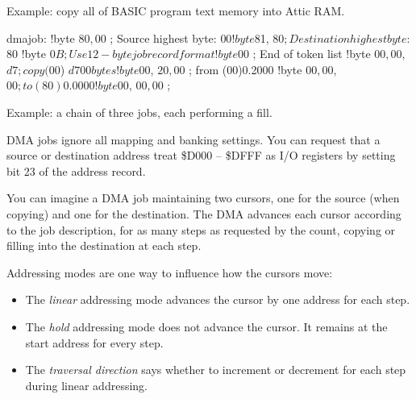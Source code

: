 Example: copy all of BASIC program text memory into Attic RAM.

\begin{asmcode}
dmajob:
!byte $80, $00       ; Source highest byte: $00
!byte $81, $80       ; Destination highest byte: $80
!byte $0B            ; Use 12-byte job record format
!byte $00            ; End of token list
!byte $00, $00, $d7  ; copy ($00) $d700 bytes
!byte $00, $20, $00  ; from (00)0.2000
!byte $00, $00, $00  ; to (80)0.0000
!byte $00, $00, $00  ;
\end{asmcode}

Example: a chain of three jobs, each performing a fill.


DMA jobs ignore all mapping and banking settings. You can request that a source or destination address treat \$D000 -- \$DFFF as I/O registers by setting bit 23 of the address record.

You can imagine a DMA job maintaining two cursors, one for the source (when copying) and one for the destination. The DMA advances each cursor according to the job description, for as many steps as requested by the count, copying or filling into the destination at each step.

Addressing modes are one way to influence how the cursors move:

\begin{itemize}
\item The {\em linear} addressing mode advances the cursor by one address for each step.
\item The {\em hold} addressing mode does not advance the cursor. It remains at the start address for every step.
\item The {\em traversal direction} says whether to increment or decrement for each step during linear addressing.
\end{itemize}

